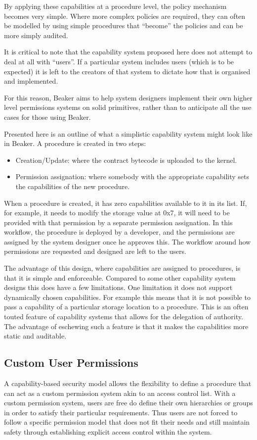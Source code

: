 \documentclass[english,a4paper]{article}
\begin{document}
By applying these capabilities at a procedure level, the policy
mechanism becomes very simple. Where more complex policies are required,
they can often be modelled by using simple procedures that ``become''
the policies and can be more simply audited.

It is critical to note that the capability system proposed here does not
attempt to deal at all with ``users''. If a particular system includes
users (which is to be expected) it is left to the creators of that
system to dictate how that is organised and implemented.

For this reason, Beaker aims to help system designers implement their
own higher level permissions systems on solid primitives, rather than to
anticipate all the use cases for those using Beaker.

Presented here is an outline of what a simplistic capability system
might look like in Beaker. A procedure is created in two steps:

\begin{itemize}
\item
  Creation/Update: where the contract bytecode is uploaded to the
  kernel.
\item
  Permission assignation: where somebody with the appropriate capability
  sets the capabilities of the new procedure.
\end{itemize}

When a procedure is created, it has zero capabilities available to it in
its list. If, for example, it needs to modify the storage value at 0x7,
it will need to be provided with that permission by a separate
permission assignation. In this workflow, the procedure is deployed by a
developer, and the permissions are assigned by the system designer once
he approves this. The workflow around how permissions are requested and
designed are left to the users.

The advantage of this design, where capabilities are assigned to
procedures, is that it is simple and enforceable. Compared to some other
capability system designs this does have a few limitations. One
limitation it does not support dynamically chosen capabilities. For
example this means that it is not possible to pass a capability of a
particular storage location to a procedure. This is an often touted
feature of capability systems that allows for the delegation of
authority. The advantage of eschewing such a feature is that it makes
the capabilities more static and auditable.

\subsection{Custom User Permissions}\label{custom-user-permissions}
A capability-based security model allows the flexibility to define a
procedure that can act as a custom permission system akin to an access
control list. With a custom permission system, users are free do define
their own hierarchies or groups in order to satisfy their particular
requirements. Thus users are not forced to follow a specific permission
model that does not fit their needs and still maintain safety through
establishing explicit access control within the system.
\end{document}
